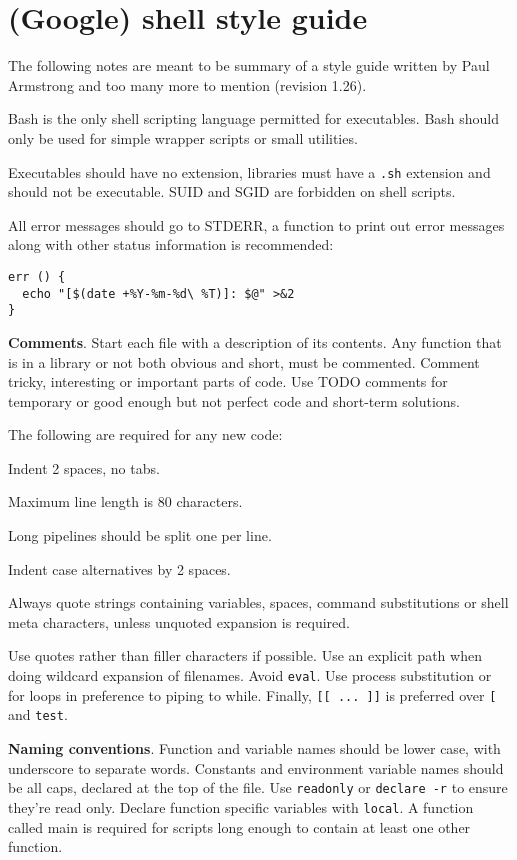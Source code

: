\section{(Google) shell style guide}
The following notes are meant to be summary of a style guide written by Paul Armstrong and too many more to mention (revision 1.26).

Bash is the only shell scripting language permitted for executables.
Bash should only be used for simple wrapper scripts or small utilities.

Executables should have no extension, libraries must have a \texttt{.sh} extension and should not be executable.
SUID and SGID are forbidden on shell scripts.

All error messages should go to STDERR,
a function to print out error messages along with other status information is recommended:
\begin{verbatim}
err () {
  echo "[$(date +%Y-%m-%d\ %T)]: $@" >&2
}
\end{verbatim}

\textbf{Comments}.
Start each file with a description of its contents.
Any function that is in a library or not both obvious and short, must be commented.
Comment tricky, interesting or important parts of code.
Use TODO comments for temporary or good enough but not perfect code and short-term solutions.

The following are required for any new code:
\begin{compactenum}
    \item Indent 2 spaces, no tabs.
    \item Maximum line length is 80 characters.
    \item Long pipelines should be split one per line.
    \item Indent case alternatives by 2 spaces.
    \item Always quote strings containing variables, spaces, command substitutions or shell meta characters, unless unquoted expansion is required. 
\end{compactenum}

Use quotes rather than filler characters if possible.
Use an explicit path when doing wildcard expansion of filenames.
Avoid \texttt{eval}.
Use process substitution or for loops in preference to piping to while.
Finally, \texttt{[[ ... ]]} is preferred over \texttt{[} and \texttt{test}.

\textbf{Naming conventions}.
Function and variable names should be lower case, with underscore to separate words.
Constants and environment variable names should be all caps, declared at the top of the file.
Use \texttt{readonly} or \texttt{declare -r} to ensure they're read only.
Declare function specific variables with \texttt{local}.
A function called main is required for scripts long enough to contain at least one other function.

